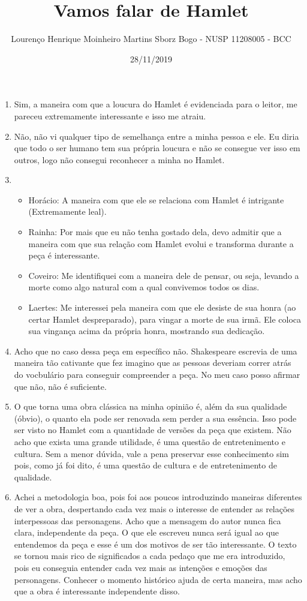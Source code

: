 \documentclass[12pt, oneside]{article}
\title{Vamos falar de Hamlet}
\author{Lourenço Henrique Moinheiro Martins Sborz Bogo - NUSP 11208005 - BCC}
\date{28/11/2019}
\begin{document}
\maketitle
\begin{enumerate}
\item Sim, a maneira com que a loucura do Hamlet é evidenciada para o leitor, me pareceu extremamente interessante e isso me atraiu.
\item Não, não vi qualquer tipo de semelhança entre a minha pessoa e ele. Eu diria que todo o ser humano tem sua própria loucura e não se consegue ver isso em outros, logo não consegui reconhecer a minha no Hamlet.
\item
  \begin{itemize}
  \item Horácio: A maneira com que ele se relaciona com Hamlet é intrigante (Extremamente leal).
  \item Rainha: Por mais que eu não tenha gostado dela, devo admitir que a maneira com que sua relação com Hamlet evolui e transforma durante a peça é interessante.
  \item Coveiro: Me identifiquei com a maneira dele de pensar, ou seja, levando a morte como algo natural com a qual convivemos todos os dias.
  \item Laertes: Me interessei pela maneira com que ele desiste de sua honra (ao certar Hamlet despreparado), para vingar a morte de sua irmã. Ele coloca sua vingança acima da própria honra, mostrando sua dedicação.
  \end{itemize}
\item Acho que no caso dessa peça em específico não. Shakespeare escrevia de uma maneira tão cativante que fez imagino que as pessoas deveriam correr atrás do vocbulário para conseguir compreender a peça. No meu caso posso afirmar que não, não é suficiente.
\item O que torna uma obra clássica na minha opinião é, além da sua qualidade (óbvio), o quanto ela pode ser renovada sem perder a sua essência. Isso pode ser visto no Hamlet com a quantidade de versões da peça que existem. Não acho que exista uma grande utilidade, é uma questão de entretenimento e cultura. Sem a menor dúvida, vale a pena preservar esse conhecimento sim pois, como já foi dito, é uma questão de cultura e de entretenimento de qualidade.
\item Achei a metodologia boa, pois foi aos poucos introduzindo maneiras diferentes de ver a obra, despertando cada vez mais o interesse de entender as relações interpessoas das personagens. Acho que a mensagem do autor nunca fica clara, independente da peça. O que ele escreveu nunca será igual ao que entendemos da peça e esse é um dos motivos de ser tão interessante. O texto se tornou mais rico de significados a cada pedaço que me era introduzido, pois eu conseguia entender cada vez mais as intenções e emoções das personagens. Conhecer o momento histórico ajuda de certa maneira, mas acho que a obra é interessante independente disso.
\end{enumerate}
\end{document}
